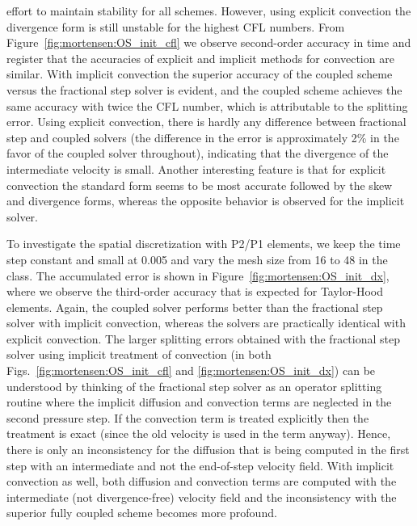 effort to maintain stability for all schemes. However, using explicit
convection the divergence form is still unstable for the highest
CFL numbers. From Figure~\ref{fig:mortensen:OS_init_cfl} we observe
second-order accuracy in time and register that the accuracies of explicit
and implicit methods for convection are similar. With
implicit convection the superior accuracy of the coupled scheme versus the
fractional step solver is evident, and the coupled scheme achieves the same
accuracy with twice the CFL number, which is attributable to
the splitting error. Using explicit convection, there is hardly any
difference between fractional step and coupled solvers (the difference
in the error is approximately 2\% in the favor of the coupled solver
throughout), indicating that the divergence of the intermediate velocity
is small. Another interesting feature is that for explicit convection
the standard form seems to be most accurate followed by the skew and
divergence forms, whereas the opposite behavior is observed for
the implicit solver.

To investigate the spatial discretization with P2/P1 elements, we
keep the time step constant and small at 0.005 and vary the mesh size
from 16 to 48 in the  class. The accumulated error is
shown in Figure~\ref{fig:mortensen:OS_init_dx}, where we observe the
third-order accuracy that is expected for Taylor-Hood elements. Again,
the coupled solver performs better than the fractional step solver
with implicit convection, whereas the solvers are practically identical
with explicit convection. The larger splitting errors obtained with the
fractional step solver using implicit treatment of convection (in both
Figs.~\ref{fig:mortensen:OS_init_cfl} and \ref{fig:mortensen:OS_init_dx})
can be understood by thinking of the fractional step solver as an operator
splitting routine where the implicit diffusion and convection terms are
neglected in the second pressure step. If the convection term is treated
explicitly then the treatment is exact (since the old velocity is used in the
term anyway). Hence, there is only an inconsistency for the diffusion
that is being computed in the first step with an intermediate and not
the end-of-step velocity field. With implicit convection as well, both
diffusion and convection terms are computed with the intermediate (not
divergence-free) velocity field and the inconsistency with the superior
fully coupled scheme becomes more profound.

